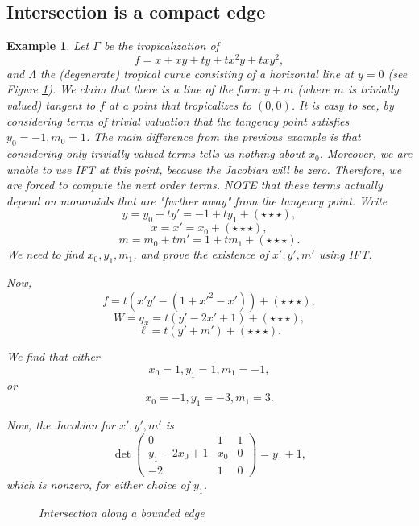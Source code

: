 \documentclass[oneside]{amsart}
\newcommand{\HOT}{(\star\star\star)}
\newtheorem{example}[thm]{Example}
\theoremstyle{definition}
\begin{document}

\subsection{Intersection is a compact edge} 
\begin{example}
Let $\Gamma$ be the tropicalization of 
\[
f = x+xy+ty+tx^2y+txy^2,
\]
and $\Lambda$ the (degenerate) tropical curve consisting of a horizontal line at $y=0$ (see Figure \ref{BoundedHorizontal}). We claim that there is a line of the form $y+m$ (where $m$ is trivially valued) tangent to $f$ at a point that tropicalizes to $(0,0)$. 
It is easy to see, by considering terms of trivial valuation that the tangency point satisfies $y_0=-1, m_0=1$. The main difference from the previous example is that considering only trivially valued terms tells us nothing about $x_0$. Moreover,  we are unable to use IFT  at this point, because the Jacobian will be zero. Therefore, we  are forced to compute the next order terms. NOTE that these terms actually depend on monomials that are "further away" from the tangency point. Write 
\[
y = y_0 + ty' = -1 + ty_1 + \HOT,
\]
\[
x = x' = x_0+ \HOT,
\]
\[
m = m_0 + tm' = 1+tm_1 + \HOT.
\]
We need to find $x_0,y_1,m_1$, and prove the existence of $x',y',m'$ using IFT.

Now, 
\[
f = t(x'y' - (1+x'^2-x')) + \HOT,
\]
\[
W = q_x = t(y' - 2x' + 1) + \HOT,
\]
\[
\ell = t(y' + m') + \HOT.
\]

We find that either
\[
x_0 = 1, y_1 = 1, m_1=-1,
\]
or
\[
x_0=-1, y_1 = -3, m_1 = 3.
\]

Now,  the Jacobian for $x',y',m'$ is
\[
\det\begin{pmatrix}
  0 & 1 & 1 \\
  y_1-2x_0+1 & x_0 & 0 \\
  -2 & 1 & 0
 \end{pmatrix} = y_1+1,
 \] 
 which is nonzero, for either choice of $y_1$. 

 
\begin{figure}
\centering
{}
\caption{Intersection along a bounded edge}
\label{BoundedHorizontal}
\end{figure}

\end{example}
\end{document}
